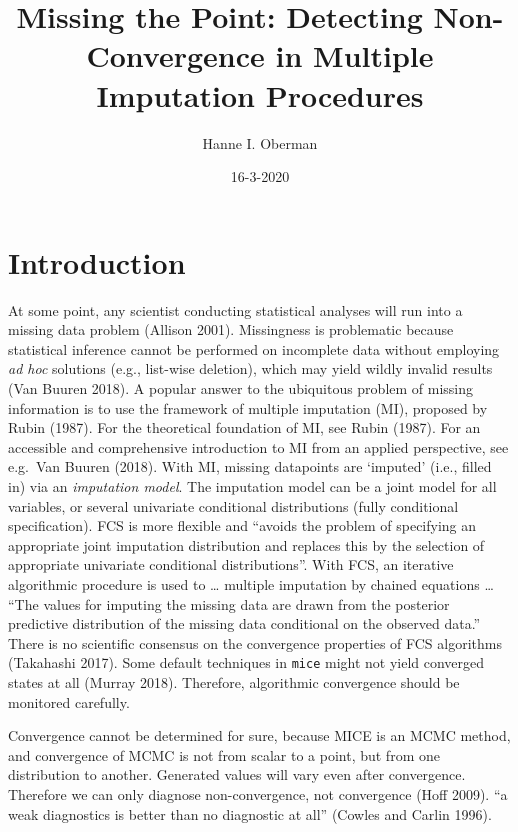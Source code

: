 \documentclass[
  Royal, times, sageapa]{sagej}
\title{Missing the Point: Detecting Non-Convergence in Multiple Imputation
Procedures}
\author{Hanne I. Oberman}
\date{16-3-2020}
\begin{document}
\maketitle

\hypertarget{introduction}{%
\section{Introduction}\label{introduction}}

At some point, any scientist conducting statistical analyses will run
into a missing data problem (Allison 2001). Missingness is problematic
because statistical inference cannot be performed on incomplete data
without employing \emph{ad hoc} solutions (e.g., list-wise deletion),
which may yield wildly invalid results (Van Buuren 2018). A popular
answer to the ubiquitous problem of missing information is to use the
framework of multiple imputation (MI), proposed by Rubin (1987). For the
theoretical foundation of MI, see Rubin (1987). For an accessible and
comprehensive introduction to MI from an applied perspective, see
e.g.~Van Buuren (2018). With MI, missing datapoints are `imputed' (i.e.,
filled in) via an \emph{imputation model}. The imputation model can be a
joint model for all variables, or several univariate conditional
distributions (fully conditional specification). FCS is more flexible
and ``avoids the problem of specifying an appropriate joint imputation
distribution and replaces this by the selection of appropriate
univariate conditional distributions''. With FCS, an iterative
algorithmic procedure is used to \ldots{} multiple imputation by chained
equations \ldots{} ``The values for imputing the missing data are drawn
from the posterior predictive distribution of the missing data
conditional on the observed data.'' There is no scientific consensus on
the convergence properties of FCS algorithms (Takahashi 2017). Some
default techniques in \texttt{mice} might not yield converged states at
all (Murray 2018). Therefore, algorithmic convergence should be
monitored carefully.

Convergence cannot be determined for sure, because MICE is an MCMC
method, and convergence of MCMC is not from scalar to a point, but from
one distribution to another. Generated values will vary even after
convergence. Therefore we can only diagnose non-convergence, not
convergence (Hoff 2009). ``a weak diagnostics is better than no
diagnostic at all'' (Cowles and Carlin 1996).
\end{document}
